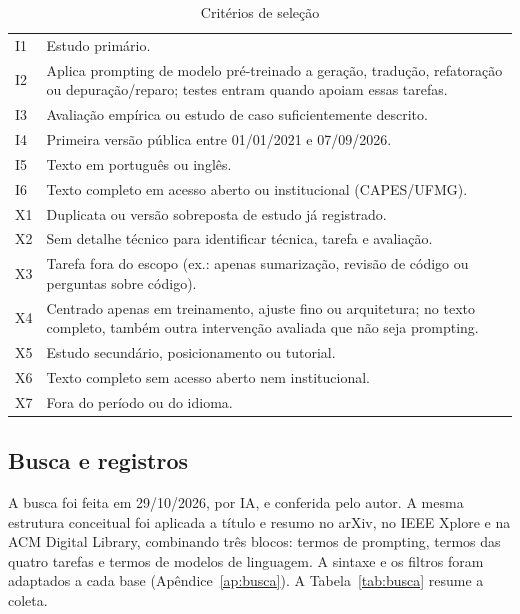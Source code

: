 \begin{table}[!htb]
\caption{Critérios de seleção}\label{tab:criterios}
\centering\footnotesize
\begin{tabular}{@{}lp{}@{}}
\hline
I1 & Estudo primário.\\
I2 & Aplica prompting de modelo pré-treinado a geração, tradução, refatoração ou depuração/reparo; testes entram quando apoiam essas tarefas.\\
I3 & Avaliação empírica ou estudo de caso suficientemente descrito.\\
I4 & Primeira versão pública entre 01/01/2021 e 07/09/2026.\\
I5 & Texto em português ou inglês.\\
I6 & Texto completo em acesso aberto ou institucional (CAPES/UFMG).\\
\hline
X1 & Duplicata ou versão sobreposta de estudo já registrado.\\
X2 & Sem detalhe técnico para identificar técnica, tarefa e avaliação.\\
X3 & Tarefa fora do escopo (ex.: apenas sumarização, revisão de código ou perguntas sobre código).\\
X4 & Centrado apenas em treinamento, ajuste fino ou arquitetura; no texto completo, também outra intervenção avaliada que não seja prompting.\\
X5 & Estudo secundário, posicionamento ou tutorial.\\
X6 & Texto completo sem acesso aberto nem institucional.\\
X7 & Fora do período ou do idioma.\\
\hline
\end{tabular}
\end{table}

\subsection{Busca e registros}\label{sec:busca}
A busca foi feita em 29/10/2026, por IA, e conferida pelo autor. A mesma estrutura conceitual foi
aplicada a título e resumo no arXiv, no IEEE Xplore e na ACM Digital Library, combinando três blocos:
termos de prompting, termos das quatro tarefas e termos de modelos de linguagem. A sintaxe e os
filtros foram adaptados a cada base (Apêndice~\ref{ap:busca}). A Tabela~\ref{tab:busca} resume a coleta.

